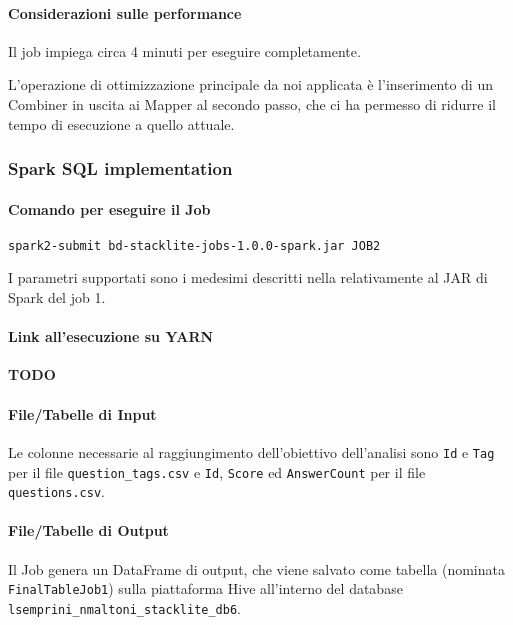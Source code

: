   \paragraph{Considerazioni sulle performance}\label{par:job2:mapreduce:performance}

  Il job impiega circa 4 minuti per eseguire completamente.

  L'operazione di ottimizzazione principale da noi applicata è l'inserimento di un Combiner in uscita ai Mapper al secondo passo,
  che ci ha permesso di ridurre il tempo di esecuzione a quello attuale.

  \subsubsection{Spark SQL implementation}\label{subsub:job2:spark}

  \paragraph{Comando per eseguire il Job}\label{par:job2:spark:cmd}

  \texttt{spark2-submit bd-stacklite-jobs-1.0.0-spark.jar JOB2}

  I parametri supportati sono i medesimi descritti nella  relativamente al JAR di Spark del job 1.

  \paragraph{Link all'esecuzione su YARN}\label{par:job2:spark:yarn}

  \textbf{TODO}

  \paragraph{File/Tabelle di Input}\label{par:job2:spark:input}

  Le colonne necessarie al raggiungimento dell'obiettivo dell'analisi sono \texttt{Id} e \texttt{Tag} per il file \texttt{question\_tags.csv}
  e \texttt{Id}, \texttt{Score} ed \texttt{AnswerCount} per il file \texttt{questions.csv}.

  \paragraph{File/Tabelle di Output}\label{par:job2:spark:output}

  Il Job genera un DataFrame di output, che viene salvato come tabella (nominata \texttt{FinalTableJob1})
  sulla piattaforma Hive all'interno del database \texttt{lsemprini\_nmaltoni\_stacklite\_db6}.

